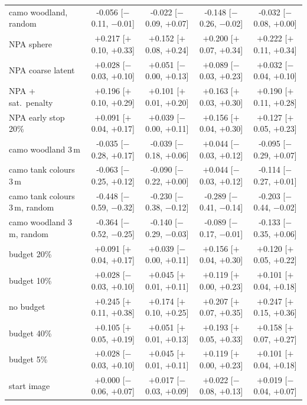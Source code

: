 \begin{table}[htbp]
{\begin{tabular}{@{}lcccc@{}}
camo woodland, random & -0.056 [$-$0.11, $-$0.01] & -0.022 [$-$0.09, $+$0.07] & -0.148 [$-$0.26, $-$0.02] & -0.032 [$-$0.08, $+$0.00]\\
NPA sphere & $+$0.217 [$+$0.10, $+$0.33] & $+$0.152 [$+$0.08, $+$0.24] & $+$0.200 [$+$0.07, $+$0.34] & $+$0.222 [$+$0.11, $+$0.34]\\
NPA coarse latent & $+$0.028 [$-$0.03, $+$0.10] & $+$0.051 [$-$0.00, $+$0.13] & $+$0.089 [$-$0.03, $+$0.23] & $+$0.032 [$-$0.04, $+$0.10]\\
NPA + sat.\ penalty & $+$0.196 [$+$0.10, $+$0.29] & $+$0.101 [$+$0.01, $+$0.20] & $+$0.163 [$+$0.03, $+$0.30] & $+$0.190 [$+$0.11, $+$0.28]\\
NPA early stop 20\% & $+$0.091 [$+$0.04, $+$0.17] & $+$0.039 [$-$0.00, $+$0.11] & $+$0.156 [$+$0.04, $+$0.30] & $+$0.127 [$+$0.05, $+$0.23]\\
camo woodland 3\,m & -0.035 [$-$0.28, $+$0.17] & -0.039 [$-$0.18, $+$0.06] & $+$0.044 [$-$0.03, $+$0.12] & -0.095 [$-$0.29, $+$0.07]\\
camo tank colours 3\,m & -0.063 [$-$0.25, $+$0.12] & -0.090 [$-$0.22, $+$0.00] & $+$0.044 [$-$0.03, $+$0.12] & -0.114 [$-$0.27, $+$0.01]\\
camo tank colours 3\,m, random & -0.448 [$-$0.59, $-$0.32] & -0.230 [$-$0.38, $-$0.12] & -0.289 [$-$0.41, $-$0.14] & -0.203 [$-$0.44, $-$0.02]\\
camo woodland 3\,m, random & -0.364 [$-$0.52, $-$0.25] & -0.140 [$-$0.29, $-$0.03] & -0.089 [$-$0.17, $-$0.01] & -0.133 [$-$0.35, $+$0.06]\\
budget 20\% & $+$0.091 [$+$0.04, $+$0.17] & $+$0.039 [$-$0.00, $+$0.11] & $+$0.156 [$+$0.04, $+$0.30] & $+$0.120 [$+$0.05, $+$0.22]\\
budget 10\% & $+$0.028 [$-$0.03, $+$0.10] & $+$0.045 [$+$0.01, $+$0.11] & $+$0.119 [$+$0.00, $+$0.23] & $+$0.101 [$+$0.04, $+$0.18]\\
no budget & $+$0.245 [$+$0.11, $+$0.38] & $+$0.174 [$+$0.10, $+$0.25] & $+$0.207 [$+$0.07, $+$0.35] & $+$0.247 [$+$0.15, $+$0.36]\\
budget 40\% & $+$0.105 [$+$0.05, $+$0.19] & $+$0.051 [$+$0.01, $+$0.13] & $+$0.193 [$+$0.05, $+$0.33] & $+$0.158 [$+$0.07, $+$0.27]\\
budget 5\% & $+$0.028 [$-$0.03, $+$0.10] & $+$0.045 [$+$0.01, $+$0.11] & $+$0.119 [$+$0.00, $+$0.23] & $+$0.101 [$+$0.04, $+$0.18]\\
start image & $+$0.000 [$-$0.06, $+$0.07] & $+$0.017 [$-$0.03, $+$0.09] & $+$0.022 [$-$0.08, $+$0.13] & $+$0.019 [$-$0.04, $+$0.07]\\
\bottomrule
\end{tabular}}
\end{table}

